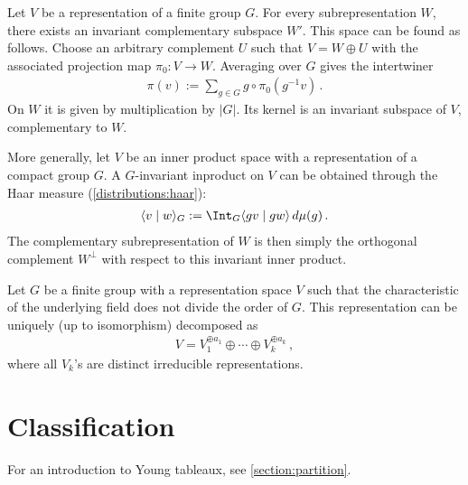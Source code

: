     \begin{property}
        Let $V$ be a representation of a finite group $G$. For every subrepresentation $W$, there exists an invariant complementary subspace $W'$. This space can be found as follows. Choose an arbitrary complement $U$ such that $V=W\oplus U$ with the associated projection map $\pi_0:V \rightarrow W$. Averaging over $G$ gives the intertwiner
        \begin{gather}
            \pi(v) := \sum_{g\in G}g\circ\pi_0(g^{-1}v)\,.
        \end{gather}
        On $W$ it is given by multiplication by $|G|$. Its kernel is an invariant subspace of $V$, complementary to $W$.

        More generally, let $V$ be an inner product space with a representation of a compact group $G$. A $G$-invariant inproduct on $V$ can be obtained through the Haar measure (\cref{distributions:haar}):
        \begin{gather}
            \langle v\mid w\rangle_G := \Int_G \langle gv\mid gw\rangle\,d\mu(g)\,.
        \end{gather}
        The complementary subrepresentation of $W$ is then simply the orthogonal complement $W^\perp$ with respect to this invariant inner product.
    \end{property}
    \begin{theorem}[Maschke]
        Let $G$ be a finite group with a representation space $V$ such that the characteristic of the underlying field does not divide the order of $G$. This representation can be uniquely (up to isomorphism) decomposed as
        \begin{gather}
            V = V_1^{\oplus a_1}\oplus\cdots\oplus V_k^{\oplus a_k}\,,
        \end{gather}
        where all $V_k$'s are distinct irreducible representations.
    \end{theorem}

\section{Classification}

    For an introduction to Young tableaux, see \cref{section:partition}.


